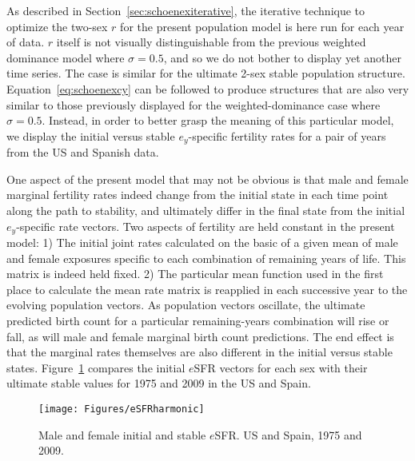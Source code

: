 \FloatBarrier
As described in Section~\ref{sec:schoenexiterative}, the iterative technique to
optimize the two-sex $r$ for the present population model is here run for each year of data. $r$ itself
is not visually distinguishable from the previous weighted dominance model where $\sigma = 0.5$,
and so we do not bother to display yet another time series. The case is similar
for the ultimate 2-sex stable population structure. Equation~\eqref{eq:schoenexcy} can 
be followed to produce structures that are also very similar to those
previously displayed for the weighted-dominance case where $\sigma =
0.5$. Instead, in order to better grasp the meaning of this particular
model, we display the initial versus stable $e_y$-specific fertility rates for a
pair of years from the US and Spanish data.

One aspect of the present model that may not be obvious is that male and female marginal
fertility rates indeed change from the initial state in each time point along
the path to stability, and ultimately differ in the final state from the initial
$e_y$-specific rate vectors. Two aspects of fertility are held constant in the
present model: 1) The initial joint rates calculated on the basic of a given
mean of male and female exposures specific to each combination of remaining
years of life. This matrix is indeed held fixed. 2) The particular mean function
used in the first place to calculate the mean rate matrix is reapplied in each
successive year to the evolving population vectors. As population vectors
oscillate, the ultimate predicted birth count for a particular remaining-years
combination will rise or fall, as will male and female marginal birth count
predictions. The end effect is that the marginal rates themselves are also
different in the initial versus stable states. Figure~\ref{fig:eSFRharmonic}
compares the initial $e$SFR vectors for each sex with their ultimate stable
values for 1975 and 2009 in the US and Spain.

\begin{figure}[ht!]
        \centering  
          \caption{Male and female initial and stable $e$SFR. US and
          Spain, 1975 and 2009.}
           \texttt{[image: Figures/eSFRharmonic]}
          \label{fig:eSFRharmonic}
\end{figure}

